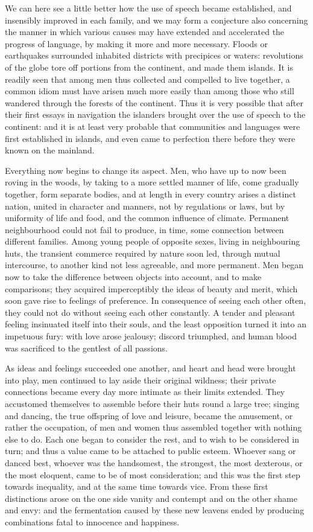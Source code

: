 \documentclass[12pt]{report}
\begin{document}
We can here see a little better how the use of speech became established, and insensibly improved in each family, and we may form a conjecture also concerning the manner in which various causes may have extended and accelerated the progress of language, by making it more and more necessary. Floods or earthquakes surrounded inhabited districts with precipices or waters: revolutions of the globe tore off portions from the continent, and made them islands. It is readily seen that among men thus collected and compelled to live together, a common idiom must have arisen much more easily than among those who still wandered through the forests of the continent. Thus it is very possible that after their first essays in navigation the islanders brought over the use of speech to the continent: and it is at least very probable that communities and languages were first established in islands, and even came to perfection there before they were known on the mainland.

Everything now begins to change its aspect. Men, who have up to now been roving in the woods, by taking to a more settled manner of life, come gradually together, form separate bodies, and at length in every country arises a distinct nation, united in character and manners, not by regulations or laws, but by uniformity of life and food, and the common influence of climate. Permanent neighbourhood could not fail to produce, in time, some connection between different families. Among young people of opposite sexes, living in neighbouring huts, the transient commerce required by nature soon led, through mutual intercourse, to another kind not less agreeable, and more permanent. Men began now to take the difference between objects into account, and to make comparisons; they acquired imperceptibly the ideas of beauty and merit, which soon gave rise to feelings of preference. In consequence of seeing each other often, they could not do without seeing each other constantly. A tender and pleasant feeling insinuated itself into their souls, and the least opposition turned it into an impetuous fury: with love arose jealousy; discord triumphed, and human blood was sacrificed to the gentlest of all passions.

As ideas and feelings succeeded one another, and heart and head were brought into play, men continued to lay aside their original wildness; their private connections became every day more intimate as their limits extended. They accustomed themselves to assemble before their huts round a large tree; singing and dancing, the true offspring of love and leisure, became the amusement, or rather the occupation, of men and women thus assembled together with nothing else to do. Each one began to consider the rest, and to wish to be considered in turn; and thus a value came to be attached to public esteem. Whoever sang or danced best, whoever was the handsomest, the strongest, the most dexterous, or the most eloquent, came to be of most consideration; and this was the first step towards inequality, and at the same time towards vice. From these first distinctions arose on the one side vanity and contempt and on the other shame and envy: and the fermentation caused by these new leavens ended by producing combinations fatal to innocence and happiness.
\end{document}
